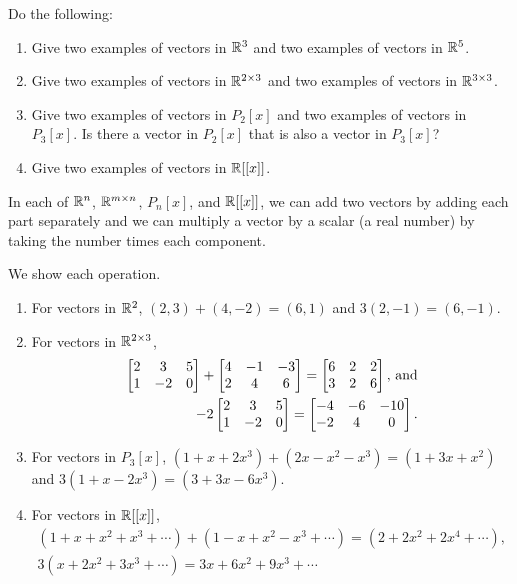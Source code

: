 \begin{problem}
  Do the following:
  \begin{enumerate}
  \item Give two examples of vectors in $\mathbb{R}^3$ and two examples
    of vectors in $\mathbb{R}^5$.
  \item Give two examples of vectors in $\mathbb{R}^{2\times 3}$ and two
    examples of vectors in $\mathbb{R}^{3\times 3}$.
  \item Give two examples of vectors in $P_2[x]$ and two examples
    of vectors in $P_3[x]$.  Is there a vector in $P_2[x]$ that is
    also a vector in $P_3[x]$?
  \item Give two examples of vectors in $\mathbb{R}[[x]]$.
  \end{enumerate}
\end{problem}

\begin{definition}[Operations]
  In each of $\mathbb{R}^n$, $\mathbb{R}^{m\times n}$, $P_n[x]$, and $\mathbb{R}[[x]]$, we
  can add two vectors by adding each part separately and we can multiply a
  vector by a scalar (a real number) by taking the number times each component.
\end{definition}

\begin{example}
  We show each operation.
  \begin{enumerate}
  \item For vectors in $\mathbb{R}^2$, $(2,3)+(4,-2)=(6,1)$ and $3(2,-1)=(6,-1)$.
  \item For vectors in $\mathbb{R}^{2\times 3}$, 
    \begin{align*}
      \begin{bmatrix} 2&3&5\\1&-2&0 \end{bmatrix}+\begin{bmatrix} 4&-1&-3\\2&4&6 \end{bmatrix}=\begin{bmatrix} 6&2&2\\3&2&6 \end{bmatrix}\text{,
        and}\\
      -2\begin{bmatrix} 2&3&5\\1&-2&0 \end{bmatrix}=\begin{bmatrix} -4&-6&-10\\-2&4&0 \end{bmatrix}.
      \end{align*}
    \item For vectors in $P_3[x]$,
      $(1+x+2x^3)+(2x-x^2-x^3)=(1+3x+x^2)$ and
      $3(1+x-2x^3)=(3+3x-6x^3)$.
    \item For vectors in $\mathbb{R}[[x]]$,
      \begin{align*}
        (1+x+x^2+x^3+\cdots) + (1-x+x^2-x^3+\cdots) =
        (2+2x^2+2x^4+\cdots),\\
        3(x+2x^2+3x^3+\cdots)=3x+6x^2+9x^3+\cdots
      \end{align*}
  \end{enumerate}
\end{example}

